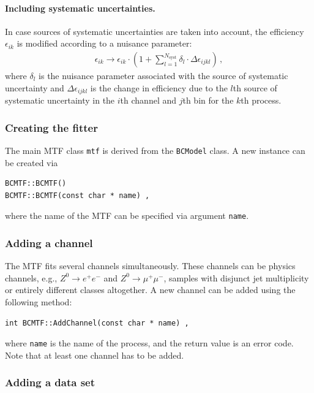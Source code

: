 \documentclass[11pt, a4paper]{article}
\begin{document}
\paragraph{Including systematic uncertainties.}
In case sources of systematic uncertainties are taken into account,
the efficiency $\epsilon_{ik}$ is modified according to a nuisance
parameter:
%
\begin{eqnarray}
\epsilon_{ik} \rightarrow \epsilon_{ik} \cdot (1 + \sum_{l=1}^{N_{\mathrm{syst}}} \delta_{l}\cdot \Delta\epsilon_{ijkl}) \, ,
\label{eqn:systematic}
\end{eqnarray}
%
where $\delta_{l}$ is the nuisance parameter associated with the
source of systematic uncertainty and $\Delta\epsilon_{ijkl}$ is the
change in efficiency due to the $l$th source of systematic uncertainty
in the $i$th channel and $j$th bin for the $k$th process.

\subsubsection{Creating the fitter}
\label{section:basics}

The main MTF class \verb|mtf| is derived from the \verb|BCModel| class.
A new instance can be created via
%
\begin{verbatim}
BCMTF::BCMTF()
BCMTF::BCMTF(const char * name) ,
\end{verbatim}
%
where the name of the MTF can be specified via argument \verb|name|.

\subsubsection{Adding a channel}

The MTF fits several channels simultaneously. These channels can be
physics channels, e.g., $Z^{0}\rightarrow e^{+}e^{-}$ and %
$Z^{0}\rightarrow \mu^{+}\mu^{-}$, samples with disjunct jet
multiplicity or entirely different classes altogether. A new channel
can be added using the following method:
%
\begin{verbatim}
int BCMTF::AddChannel(const char * name) ,
\end{verbatim}
%
where \verb|name| is the name of the process, and the return value is
an error code. Note that at least one channel has to be added.

\subsubsection{Adding a data set}
\end{document}
